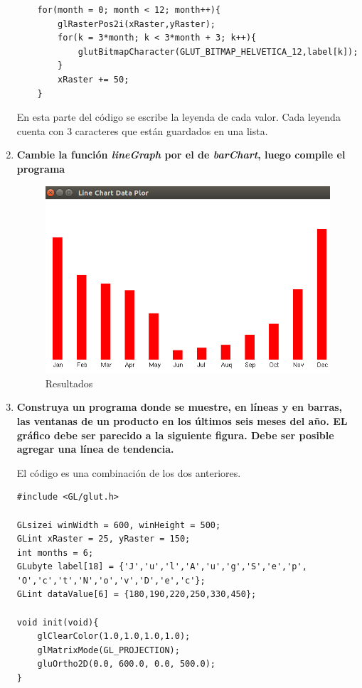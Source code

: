 \documentclass[a4paper,12pt]{article}
\begin{document}
\begin{enumerate}
 \begin{lstlisting}
    for(month = 0; month < 12; month++){
        glRasterPos2i(xRaster,yRaster);
        for(k = 3*month; k < 3*month + 3; k++){
            glutBitmapCharacter(GLUT_BITMAP_HELVETICA_12,label[k]);
        }
        xRaster += 50;
    }
 \end{lstlisting}
 En esta parte del código se escribe la leyenda de cada valor. Cada leyenda cuenta con 3 caracteres que están guardados en una lista.
 
\item \textbf{Cambie la función \textit{lineGraph} por el de \textit{barChart}, luego compile el programa}

\begin{figure}[H]
 \centering
 \includegraphics[scale = 0.5]{2.png}
 \caption{Resultados}
\end{figure}


\item \textbf{Construya un programa donde se muestre, en líneas y en barras, las ventanas de un producto en los últimos seis meses del año. EL gráfico debe ser parecido
a la siguiente figura. Debe ser posible agregar una línea de tendencia.}

El código es una combinación de los dos anteriores.

\begin{lstlisting}
#include <GL/glut.h>

GLsizei winWidth = 600, winHeight = 500;
GLint xRaster = 25, yRaster = 150;
int months = 6;
GLubyte label[18] = {'J','u','l','A','u','g','S','e','p',
'O','c','t','N','o','v','D','e','c'};
GLint dataValue[6] = {180,190,220,250,330,450};

void init(void){
	glClearColor(1.0,1.0,1.0,1.0);
	glMatrixMode(GL_PROJECTION);
	gluOrtho2D(0.0, 600.0, 0.0, 500.0);
}


\end{lstlisting}
\end{enumerate}
\end{document}
